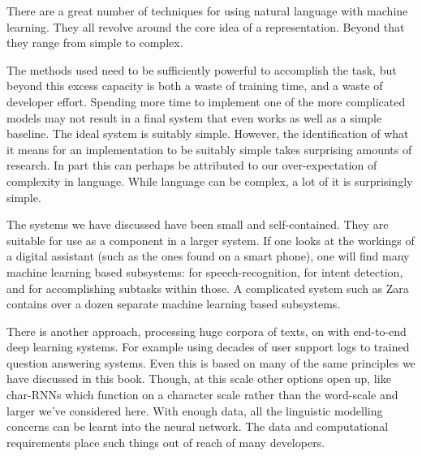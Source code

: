 \documentclass[12pt,parskip]{komatufte}
\begin{document}
There are a great number of techniques for using natural language with machine learning.
They all revolve around the core idea of a representation.
Beyond that they range from simple to complex.




The methods used need to be sufficiently powerful to accomplish the task,
but beyond this excess capacity is both a waste of training time,
and a waste of developer effort.
Spending more time to implement one of the more complicated models may not result in a final system that even works as well as a simple baseline.
The ideal system is suitably simple.
However, the identification of what it means for an implementation to be suitably simple takes surprising amounts of research.
In part this can perhaps be attributed to our over-expectation of complexity in language.
While language can be complex, a lot of it is surprisingly simple.


The systems we have discussed have been small and self-contained.
They are suitable for use as a component in a larger system.
If one looks at the workings of a digital assistant (such as the ones found on a smart phone),
one will find many machine learning based subsystems:
for speech-recognition, for intent detection, and for accomplishing subtasks within those.
A complicated system such as Zara  contains over a dozen separate machine learning based subsystems.


There is another approach, processing huge corpora of texts, on with end-to-end deep learning systems.
For example using decades of user support logs to trained question answering systems.
Even this is based on many of the same principles we have discussed in this book.
Though, at this scale other options open up, like char-RNNs which function on a character scale rather than the word-scale and larger we've considered here.
With enough data, all the linguistic modelling concerns can be learnt into the neural network.
The data and computational requirements place such things out of reach of many developers.
\end{document}
